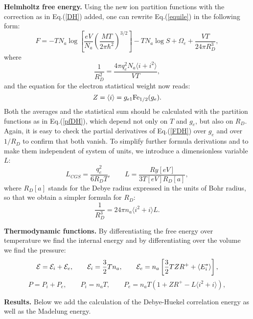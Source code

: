 {\bf Helmholtz free energy.}
Using the new ion partition functions with the correction as in Eq.(\ref{DH}) added,
one can rewrite Eq.(\ref{equile}) in the following form:
\begin{equation}\label{FDH}
F = -TN_a\log\left[\frac{eV}{N_a}\left(\frac{MT}{2\pi \hbar^2}\right)^{3/2}\right]-TN_a\log S +\Omega_e +\frac{VT}{24\pi R_D^3}, 
\end{equation}
where
\begin{equation}\label{RDdef}
\frac1{R_D^2} = \frac{4\pi q_e^2N_a\langle i+i^2\rangle}{VT},
\end{equation}
and the equation for the electron statistical weight now reads:
\begin{equation}
Z=\langle i\rangle=g_{e1}{\rm Fe}_{1/2}(g_e).
\end{equation}
Both the averages and the statistical sum
should be calculated with the partition functions as in
Eq.(\ref{pfDH}), which depend not only on $T$ and $g_e$, but also on $R_D$.
Again, it is easy to check the partial derivatives of
Eq.(\ref{FDH}) over $g_e$ and over $1/R_D$ to confirm that
 both vanish.
To simplify further formula derivations and to make them independent of system of units,
we introduce a dimensionless variable $L$:
\begin{equation}
L_{CGS} = \frac{q_e^2}{6 R_D T},\qquad
L = \frac{Ry[eV]}{3 T[eV] R_D[a]},
\end{equation}
where $R_D[a]$ stands for the Debye radius expressed in the units of Bohr radius,
so that we obtain a simpler formula for $R_D$:
\begin{equation}
\frac{1}{R_D^3} = 24 \pi n_a \langle i^2+i \rangle L.
\end{equation}

{\bf Thermodynamic functions.}
By differentiating the free energy over temperature we find the internal energy and by differentiating over the volume we find the pressure:
\begin{equation}\label{EDH}
{\cal E}={\cal E}_i + {\cal E}_e, \qquad
{\cal E}_i = \frac32 Tn_a, \qquad
{\cal E}_e = n_a \left[ \frac32 TZR^+ + \langle E^*_i\rangle \right],
\end{equation}
\begin{equation}\label{PDH}
P = P_i+P_e, \qquad
P_i = n_a T, \qquad
P_e = n_a T (1 + ZR^+ - L \langle i^2+i \rangle),
\end{equation}

{\bf Results.}
Below we add the calculation of the Debye-Huekel correlation energy as well as the Madelung energy.
\begin{center}
 
\par\end{center}

